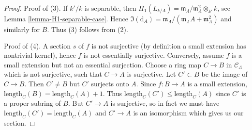 \begin{proof}
\medskip\noindent
Proof of (3). If $k'/k$ is separable, then
$H_1(L_{k/\Lambda}) =
\mathfrak m_\Lambda/\mathfrak m_\Lambda^2 \otimes_{k'} k$, see
Lemma \ref{lemma-H1-separable-case}.
Hence $\Im(\text{d}_A) =
\mathfrak m_A/(\mathfrak m_\Lambda A + \mathfrak m_A^2)$
and similarly for $B$. Thus (3) follows from (2).

\medskip\noindent
Proof of (4). A section $s$ of $f$ is not surjective (by definition a
small extension has nontrivial kernel), hence $f$ is not essentially
surjective. Conversely, assume $f$ is a small extension but not an
essential surjection. Choose a ring map $C \to B$ in $\mathcal{C}_\Lambda$
which is not surjective, such that $C \to A$ is surjective. Let
$C' \subset B$ be the image of $C \to B$. Then $C' \not = B$ but
$C'$ surjects onto $A$. Since $f : B \to A$ is a small extension,
$\text{length}_C(B) = \text{length}_C(A) + 1$. Thus
$\text{length}_C(C') \leq \text{length}_C(A)$ since
$C'$ is a proper subring of $B$. But $C' \to A$ is surjective, so in
fact we must have $\text{length}_C(C') = \text{length}_C(A)$ and
$C' \to A$ is an isomorphism which gives us our section.
\end{proof}